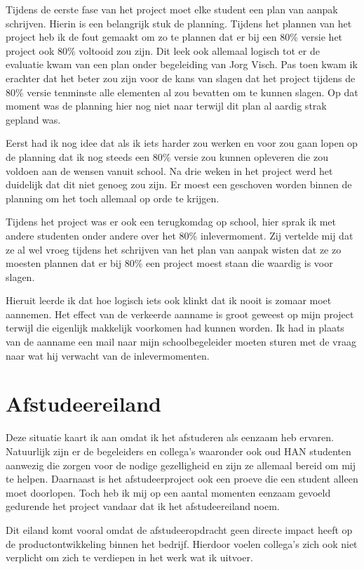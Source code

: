 \documentclass[a4paper, 11pt, oneside]{report}
\begin{document}
Tijdens de eerste fase van het project moet elke student een plan van aanpak schrijven. Hierin is een belangrijk stuk de planning. Tijdens het plannen van het project heb ik de fout gemaakt om zo te plannen dat er bij een 80\% versie het project ook 80\% voltooid zou zijn. Dit leek ook allemaal logisch tot er de evaluatie kwam van een plan onder begeleiding van Jorg Visch. Pas toen kwam ik erachter dat het beter zou zijn voor de kans van slagen dat het project tijdens de 80\% versie tenminste alle elementen al zou bevatten om te kunnen slagen. 
Op dat moment was de planning hier nog niet naar terwijl dit plan al aardig strak gepland was.

Eerst had ik nog idee dat als ik iets harder zou werken en voor zou gaan lopen op de planning dat ik nog steeds een 80\% versie zou kunnen opleveren die zou voldoen aan de wensen vanuit school. Na drie weken in het project werd het duidelijk dat dit niet genoeg zou zijn. Er moest een geschoven worden binnen de planning om het toch allemaal op orde te krijgen.

Tijdens het project was er ook een terugkomdag op school, hier sprak ik met andere studenten onder andere over het 80\% inlevermoment. Zij vertelde mij dat ze al wel vroeg tijdens het schrijven van het plan van aanpak wisten dat ze zo moesten plannen dat er bij 80\% een project moest staan die waardig is voor slagen.

Hieruit leerde ik dat hoe logisch iets ook klinkt dat ik nooit is zomaar moet aannemen. Het effect van de verkeerde aanname is groot geweest op mijn project terwijl die eigenlijk makkelijk voorkomen had kunnen worden. Ik had in plaats van de aanname een mail naar mijn schoolbegeleider moeten sturen met de vraag naar wat hij verwacht van de inlevermomenten.  
  


\section{Afstudeereiland}
Deze situatie kaart ik aan omdat ik het afstuderen als eenzaam heb ervaren.
Natuurlijk zijn er de begeleiders en collega's waaronder ook oud HAN studenten aanwezig die zorgen voor de nodige gezelligheid en zijn ze allemaal bereid om mij te helpen.
Daarnaast is het afstudeerproject ook een proeve die een student alleen moet doorlopen.
Toch heb ik mij op een aantal momenten eenzaam gevoeld gedurende het project vandaar dat ik het afstudeereiland noem.

Dit eiland komt vooral omdat de afstudeeropdracht geen directe impact heeft op de productontwikkeling binnen het bedrijf. Hierdoor voelen collega's zich ook niet verplicht om zich te verdiepen in het werk wat ik uitvoer. 
\end{document}
